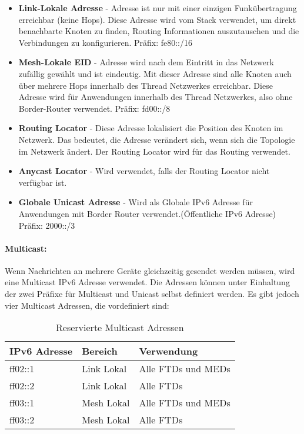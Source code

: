 \begin{itemize}
	\item \textbf{Link-Lokale Adresse} - Adresse ist nur mit einer einzigen Funkübertragung erreichbar (keine Hops). Diese Adresse wird vom Stack verwendet, um direkt benachbarte Knoten zu finden, Routing Informationen auszutauschen und die Verbindungen zu konfigurieren. Präfix: fe80::/16
	\item \textbf{Mesh-Lokale EID} - Adresse wird nach dem Eintritt in das Netzwerk zufällig gewählt und ist eindeutig. Mit dieser Adresse sind alle Knoten auch über mehrere Hops innerhalb des Thread Netzwerkes erreichbar. Diese Adresse wird für Anwendungen innerhalb des Thread Netzwerkes, also ohne Border-Router verwendet. Präfix: fd00::/8
	\item \textbf{Routing Locator} - Diese Adresse lokalisiert die Position des Knoten im Netzwerk. Das bedeutet, die Adresse verändert sich, wenn sich die Topologie im Netzwerk ändert. Der Routing Locator wird für das Routing verwendet.
	\item \textbf{Anycast Locator} - Wird verwendet, falls der Routing Locator nicht verfügbar ist.
	\item \textbf{Globale Unicast Adresse} - Wird als Globale IPv6 Adresse für Anwendungen mit Border Router verwendet.(Öffentliche IPv6 Adresse) Präfix: 2000::/3
\end{itemize}

\paragraph{Multicast:}
Wenn Nachrichten an mehrere Geräte gleichzeitig gesendet werden müssen, wird eine Multicast IPv6 Adresse verwendet. Die Adressen können unter Einhaltung der zwei Präfixe für Multicast und Unicast selbst definiert werden. Es gibt jedoch vier Multicast Adressen, die vordefiniert sind:

\begin{table}[H]
	\centering
	\begin{tabular}{|l|l|l|}
		\hline
		\textbf{IPv6 Adresse} & \textbf{Bereich} & \textbf{Verwendung} \\ \hline
		ff02::1               & Link Lokal       & Alle FTDs und MEDs  \\ \hline
		ff02::2               & Link Lokal       & Alle FTDs           \\ \hline
		ff03::1               & Mesh Lokal       & Alle FTDs und MEDs  \\ \hline
		ff03::2               & Mesh Lokal       & Alle FTDs           \\ \hline
	\end{tabular}
	\caption{Reservierte Multicast Adressen}
	\label{table:ReservierteMulticastAdressen}
\end{table}

